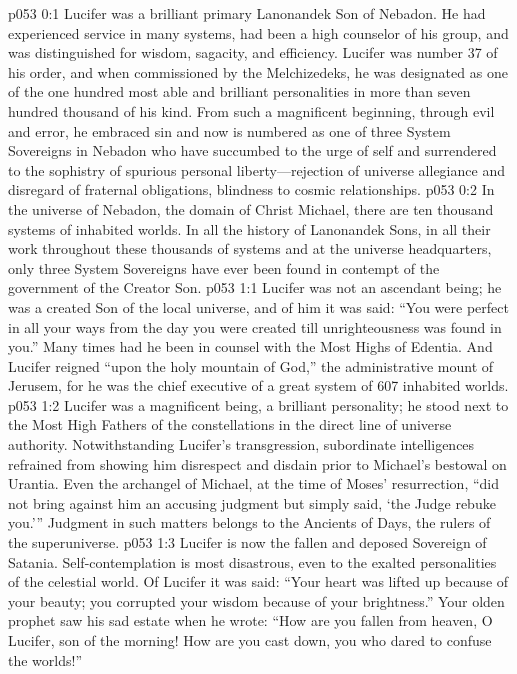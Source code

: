 \author{Manovandet Melchizedek}
\vs p053 0:1 Lucifer was a brilliant primary Lanonandek Son of Nebadon. He had experienced service in many systems, had been a high counselor of his group, and was distinguished for wisdom, sagacity, and efficiency. Lucifer was number 37 of his order, and when commissioned by the Melchizedeks, he was designated as one of the one hundred most able and brilliant personalities in more than seven hundred thousand of his kind. From such a magnificent beginning, through evil and error, he embraced sin and now is numbered as one of three System Sovereigns in Nebadon who have succumbed to the urge of self and surrendered to the sophistry of spurious personal liberty---rejection of universe allegiance and disregard of fraternal obligations, blindness to cosmic relationships.
\vs p053 0:2 In the universe of Nebadon, the domain of Christ Michael, there are ten thousand systems of inhabited worlds. In all the history of Lanonandek Sons, in all their work throughout these thousands of systems and at the universe headquarters, only three System Sovereigns have ever been found in contempt of the government of the Creator Son.
\vs p053 1:1 Lucifer was not an ascendant being; he was a created Son of the local universe, and of him it was said: “You were perfect in all your ways from the day you were created till unrighteousness was found in you.” Many times had he been in counsel with the Most Highs of Edentia. And Lucifer reigned “upon the holy mountain of God,” the administrative mount of Jerusem, for he was the chief executive of a great system of 607 inhabited worlds.
\vs p053 1:2 Lucifer was a magnificent being, a brilliant personality; he stood next to the Most High Fathers of the constellations in the direct line of universe authority. Notwithstanding Lucifer’s transgression, subordinate intelligences refrained from showing him disrespect and disdain prior to Michael’s bestowal on Urantia. Even the archangel of Michael, at the time of Moses’ resurrection, “did not bring against him an accusing judgment but simply said, ‘the Judge rebuke you.’” Judgment in such matters belongs to the Ancients of Days, the rulers of the superuniverse.
\vs p053 1:3 Lucifer is now the fallen and deposed Sovereign of Satania. Self\hyp{}contemplation is most disastrous, even to the exalted personalities of the celestial world. Of Lucifer it was said: “Your heart was lifted up because of your beauty; you corrupted your wisdom because of your brightness.” Your olden prophet saw his sad estate when he wrote: “How are you fallen from heaven, O Lucifer, son of the morning! How are you cast down, you who dared to confuse the worlds!”

